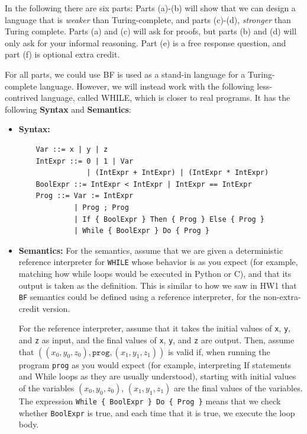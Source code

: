 \documentclass{article}
\theoremstyle{plain}
\begin{document}
\begin{enumerate}
In the following there are six parts:
Parts (a)-(b) will show that we can design a language that is \emph{weaker} than Turing-complete,
and parts (c)-(d), \emph{stronger} than Turing complete.
Parts (a) and (c) will ask for proofs, but parts (b) and (d) will only ask for your informal reasoning.
Part (e) is a free response question,
and part (f) is optional extra credit.

For all parts, we could use BF is used as a stand-in language for a Turing-complete language. However, we will instead work with the following less-contrived language, called WHILE, which is closer to real programs.
It has the following \textbf{Syntax} and \textbf{Semantics}:

\begin{itemize}
\item \textbf{Syntax:}
\begin{verbatim}
    Var ::= x | y | z
    IntExpr ::= 0 | 1 | Var
                | (IntExpr + IntExpr) | (IntExpr * IntExpr)
    BoolExpr ::= IntExpr < IntExpr | IntExpr == IntExpr
    Prog ::= Var := IntExpr
             | Prog ; Prog
             | If { BoolExpr } Then { Prog } Else { Prog }
             | While { BoolExpr } Do { Prog }
\end{verbatim}

\item \textbf{Semantics:}
For the semantics, assume that we are given a deterministic reference interpreter for \texttt{WHILE} whose behavior is as you expect (for example, matching how while loops would be executed in Python or C), and that its output is taken as the definition. This is similar to how we saw in HW1 that \texttt{BF} semantics could be defined using a reference interpreter, for the non-extra-credit version.

For the reference interpreter, assume that it takes the initial values of \texttt{x}, \texttt{y}, and \texttt{z} as input, and the final values of \texttt{x}, \texttt{y}, and \texttt{z} are output.  Then, assume that
$((x_0, y_0, z_0), \texttt{prog}, (x_1, y_1, z_1))$ is valid if, when running the program \texttt{prog} as you would expect (for example, interpreting If statements and While loops as they are usually understood), starting with initial values of the variables $(x_0, y_0, z_0)$, $(x_1, y_1, z_1)$ are the final values of the variables.
The expression \texttt{While \{ BoolExpr \} Do \{ Prog \}}
means that we check whether \texttt{BoolExpr} is true, and each time that it is true, we execute the loop body.


\end{itemize}
\end{enumerate}
\end{document}
